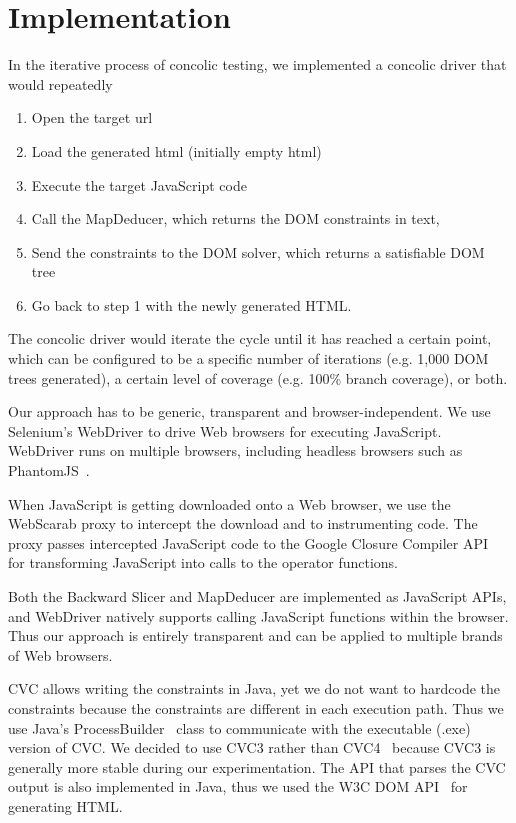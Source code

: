 \section{Implementation}

In the iterative process of concolic testing, we implemented a concolic driver that would repeatedly
\begin {enumerate}
\item Open the target url
\item Load the generated html (initially empty html)
\item Execute the target JavaScript code
\item Call the MapDeducer, which returns the DOM constraints in text,
\item Send the constraints to the DOM solver, which returns a satisfiable DOM tree
\item Go back to step 1 with the newly generated HTML.
\end{enumerate}
The concolic driver would iterate the cycle until it has reached a certain point, which can be configured to be a specific number of iterations (e.g. 1,000 DOM trees generated), a certain level of coverage (e.g. 100\% branch coverage), or both. 


Our approach has to be generic, transparent and browser-independent.  
We use Selenium's WebDriver\cite{webdriverjs} to drive Web browsers for executing JavaScript.  WebDriver runs on multiple browsers, including headless browsers such as PhantomJS~\cite{phantomjs}.  

When JavaScript is getting downloaded onto a Web browser, we use the WebScarab proxy to intercept the download and to instrumenting code.  
The proxy passes intercepted JavaScript code to the Google Closure Compiler API~\cite{ClosureCompiler} for transforming JavaScript into calls to the operator functions. 

Both the Backward Slicer and MapDeducer are implemented as JavaScript APIs, and WebDriver natively supports calling JavaScript functions within the browser.  
Thus our approach is entirely transparent and can be applied to multiple brands of Web browsers.    


CVC allows writing the constraints in Java, yet we do not want to hardcode the constraints because the constraints are different in each execution path.  
Thus we use Java's ProcessBuilder~\cite{processbuilder} class to communicate with the executable (.exe) version of CVC.  We decided to use CVC3 rather than CVC4~\cite{cvc4} because CVC3 is generally more stable during our experimentation.  
The API that parses the CVC output is also implemented in Java, thus we used the W3C DOM API~\cite{DomAPI} for generating HTML.  


